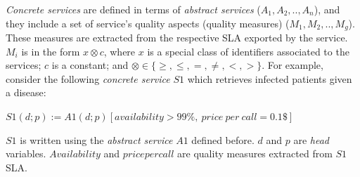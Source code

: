 \textit{Concrete services} are defined in terms of \textit{abstract services} ($A_{1}, A_{2}, .., A_{n}$), and they include a set of service's quality aspects (quality measures) ($M_{1},M_{2}, .., M_{g}$). 
These measures are extracted from the respective SLA exported by the service.
%
%
$M_{i}$ is in the form $x \otimes c$, where $x$ is a special class of identifiers associated to the services; $c$ is a constant; and $\otimes \in\lbrace \geq, \leq, =, \neq, <, >\rbrace$. For example, consider the following \textit{concrete service} $S1$ which retrieves infected patients given a disease: 
\begin{center}
\small
\begin{math}
S1(d; p) := A1(d; p)[availability > 99\%, \ price \ per \ call = 0.1\$]
\end{math}
\end{center}
%
$S1$ is written using the \textit{abstract service} $A1$ defined before.
$d$ and $p$ are \textit{head} variables. 
$Availability$ and $price per call$ are quality measures extracted from $S1$ SLA.
%


